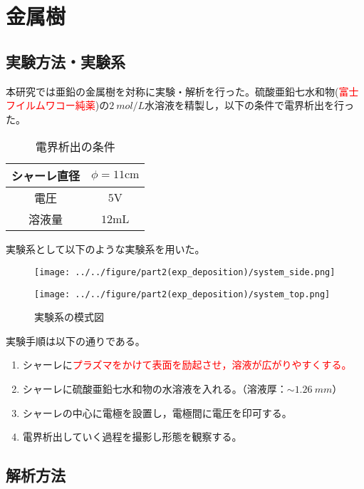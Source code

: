 \documentclass[autodetect-engine,dvi=dvipdfmx,a4paper,ja=standard,oneside,openany,11pt,draft]{bxjsarticle}
\begin{document}
\section{金属樹}
\subsection{実験方法・実験系}
本研究では亜鉛の金属樹を対称に実験・解析を行った。硫酸亜鉛七水和物(\textcolor{red}{富士フイルムワコー純薬})の$\SI{2}{mol/L}$水溶液を精製し，以下の条件で電界析出を行った。
\begin{table}[H]
  \centering
  \caption{電界析出の条件}
  \begin{tabular}{c||c}
    \hline
    シャーレ直径 & $\phi = 11 \si{\cm}$ \\ \hline
    電圧     & $5 \si{\V}$          \\ \hline
    溶液量    & $12 \si{\mL}$        \\
    \hline
  \end{tabular}
\end{table}
実験系として以下のような実験系を用いた。
\begin{figure}[H]
  \begin{minipage}
    {0.65\textwidth}
    \centering
    \texttt{[image: ../../figure/part2(exp\_deposition)/system\_side.png]}
    \label{fig:el_dep_mol}
  \end{minipage}
  \begin{minipage}
    {0.32\textwidth}
    \centering
    \texttt{[image: ../../figure/part2(exp\_deposition)/system\_top.png]}
    \label{fig:el_dep_fractal}
  \end{minipage}
  \caption{実験系の模式図}
\end{figure}
実験手順は以下の通りである。
\begin{enumerate}
  \item シャーレに\textcolor{red}{プラズマをかけて表面を励起させ，溶液が広がりやすくする。}
  \item シャーレに硫酸亜鉛七水和物の水溶液を入れる。（溶液厚：$\sim\SI{1.26}{mm}$）
  \item シャーレの中心に電極を設置し，電極間に電圧を印可する。
  \item 電界析出していく過程を撮影し形態を観察する。
\end{enumerate}
\subsection{解析方法}
\end{document}
